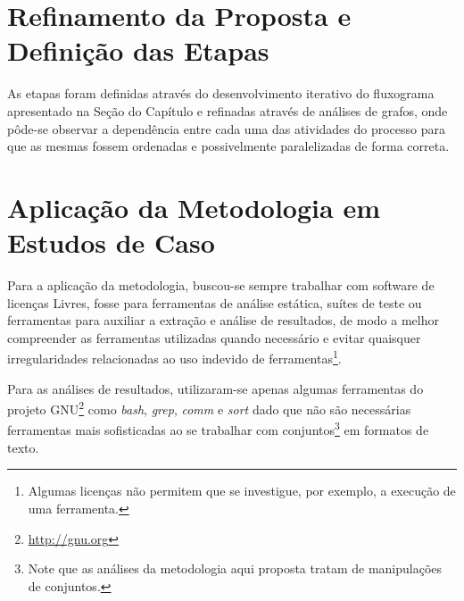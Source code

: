 \section{Refinamento da Proposta e Definição das Etapas}

As etapas foram definidas através do desenvolvimento iterativo do fluxograma apresentado na Seção  do Capítulo  e refinadas através de análises de grafos, onde pôde-se observar a dependência entre cada uma das atividades do processo para que as mesmas fossem ordenadas e possivelmente paralelizadas de forma correta.

\section{Aplicação da Metodologia em Estudos de Caso}

Para a aplicação da metodologia, buscou-se sempre trabalhar com software de licenças Livres, fosse para ferramentas de análise estática, suítes de teste ou ferramentas para auxiliar a extração e análise de resultados, de modo a melhor compreender as ferramentas utilizadas quando necessário e evitar quaisquer irregularidades relacionadas ao uso indevido de ferramentas\footnote{Algumas licenças não permitem que se investigue, por exemplo, a execução de uma ferramenta.}.

Para as análises de resultados, utilizaram-se apenas algumas ferramentas do projeto GNU\footnote{\url{http://gnu.org}} como \textit{bash}, \textit{grep}, \textit{comm} e \textit{sort} dado que não são necessárias ferramentas mais sofisticadas ao se trabalhar com conjuntos\footnote{Note que as análises da metodologia aqui proposta tratam de manipulações de conjuntos.} em formatos de texto.

